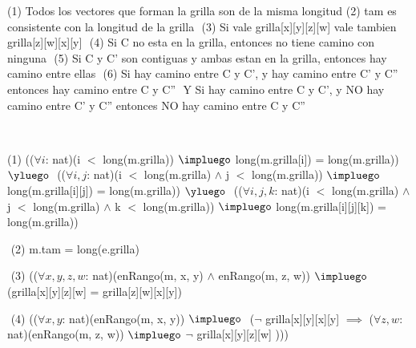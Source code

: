 \begin{Representacion}

$ $\newline

(1) Todos los vectores que forman la grilla son de la misma longitud$ $\newline
(2) tam es consistente con la longitud de la grilla $ $\newline
(3) Si vale grilla[x][y][z][w] vale tambien grilla[z][w][x][y] $ $\newline
(4) Si C no esta en la grilla, entonces no tiene camino con ninguna $ $\newline
(5) Si C y C' son contiguas y ambas estan en la grilla, entonces hay camino entre ellas $ $\newline
(6) Si hay camino entre C y C', y hay camino entre C' y C'' entonces hay camino entre C y C'' $ $\newline
Y Si hay camino entre C y C', y NO hay camino entre C' y C'' entonces NO hay camino entre C y C'' $ $\newline


$ $\newline
$ $\newline

(1)
(($\forall i$: nat)(i $<$ long(m.grilla)) $\impluego$ long(m.grilla[i]) = long(m.grilla)) $\yluego$ $ $\newline
(($\forall i, j$: nat)(i $<$ long(m.grilla) $\land$ j $<$ long(m.grilla)) $\impluego$ long(m.grilla[i][j]) = long(m.grilla)) $\yluego$ $ $\newline
(($\forall i, j, k$: nat)(i $<$ long(m.grilla) $\land$ j $<$ long(m.grilla) $\land$ k $<$ long(m.grilla)) $\impluego$ $ $\newline long(m.grilla[i][j][k]) = long(m.grilla))

$ $\newline
(2)
m.tam = long(e.grilla)

$ $\newline
(3) 
(($\forall x, y, z, w$: nat)(enRango(m, x, y) $\land$ enRango(m, z, w)) $\impluego$ (grilla[x][y][z][w] = grilla[z][w][x][y])

$ $\newline
(4)
(($\forall x, y$: nat)(enRango(m, x, y)) $\impluego$ $ $\newline 
($\neg$ grilla[x][y][x][y] $\implies$
($\forall z, w$: nat)(enRango(m, z, w)) $\impluego$
$\neg$ grilla[x][y][z][w] ))) 


\end{Representacion}
